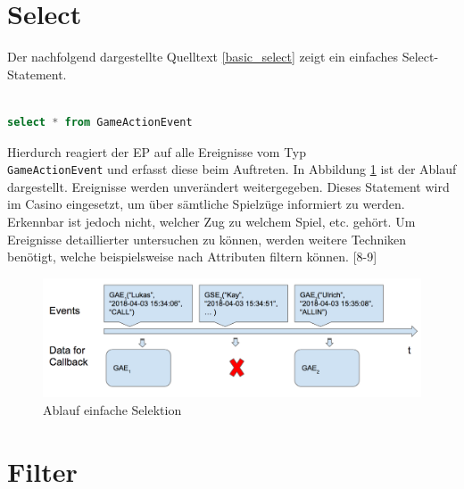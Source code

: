 \section{Select}

Der nachfolgend dargestellte Quelltext \ref{basic_select} zeigt ein einfaches Select-Statement.
\begin{lstlisting}[caption={Statement einfache Selektion},label=basic_select,captionpos=b,language=SQL]

select * from GameActionEvent

\end{lstlisting}
Hierdurch reagiert der \acf{EP} auf alle Ereignisse vom Typ \\ \texttt{GameActionEvent} und  erfasst diese beim Auftreten. 
In Abbildung \ref{basic_select_img} ist der Ablauf dargestellt. Ereignisse werden unverändert weitergegeben. Dieses Statement wird im Casino eingesetzt, um über sämtliche Spielzüge informiert zu werden. Erkennbar ist jedoch nicht, welcher Zug zu welchem Spiel, etc. gehört. Um Ereignisse detaillierter untersuchen zu können, werden weitere Techniken benötigt, welche beispielsweise nach Attributen filtern können.
\cite{EsperRef2018}[8-9]

\begin{figure}[h]
	\centering
	\includegraphics[width=\textwidth,height=\textheight, keepaspectratio]{images/statement_basic_select.png}
	\caption{Ablauf einfache Selektion}
	\label{basic_select_img}
\end{figure}

\section{Filter}

